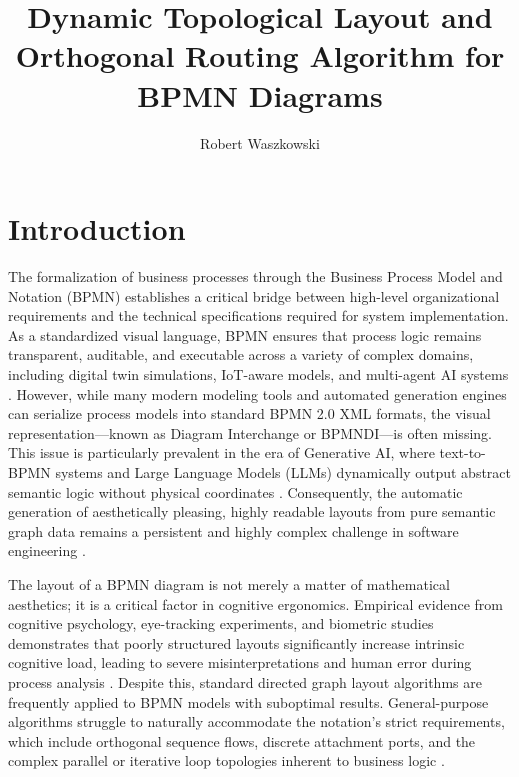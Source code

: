 \documentclass[fleqn,10pt]{wlscirep}
\title{Dynamic Topological Layout and Orthogonal Routing Algorithm for BPMN Diagrams}
\author[1,*]{Robert Waszkowski}
\affil[1]{Affiliation, department, city, postcode, country}
\affil[*]{corresponding.author@example.com}
\begin{document}
\flushbottom
\maketitle
\thispagestyle{empty}

\section*{Introduction}
The formalization of business processes through the Business Process Model and Notation (BPMN) establishes a critical bridge between high-level organizational requirements and the technical specifications required for system implementation. As a standardized visual language, BPMN ensures that process logic remains transparent, auditable, and executable across a variety of complex domains, including digital twin simulations, IoT-aware models, and multi-agent AI systems \cite{ref_akinbowale, ref_tebourbi, ref_lopes}. However, while many modern modeling tools and automated generation engines can serialize process models into standard BPMN 2.0 XML formats, the visual representation---known as Diagram Interchange or BPMNDI---is often missing. This issue is particularly prevalent in the era of Generative AI, where text-to-BPMN systems and Large Language Models (LLMs) dynamically output abstract semantic logic without physical coordinates \cite{ref_licardo, ref_kourani_promoai, ref_nivon}. Consequently, the automatic generation of aesthetically pleasing, highly readable layouts from pure semantic graph data remains a persistent and highly complex challenge in software engineering \cite{ref_jointjs, ref_effinger_interactive}.

The layout of a BPMN diagram is not merely a matter of mathematical aesthetics; it is a critical factor in cognitive ergonomics. Empirical evidence from cognitive psychology, eye-tracking experiments, and biometric studies demonstrates that poorly structured layouts significantly increase intrinsic cognitive load, leading to severe misinterpretations and human error during process analysis \cite{ref_de_souza, ref_lubke_eye, ref_schrepfer, ref_wlekly}. Despite this, standard directed graph layout algorithms are frequently applied to BPMN models with suboptimal results. General-purpose algorithms struggle to naturally accommodate the notation's strict requirements, which include orthogonal sequence flows, discrete attachment ports, and the complex parallel or iterative loop topologies inherent to business logic \cite{ref_kitzmann, ref_gschwind}.
\end{document}
